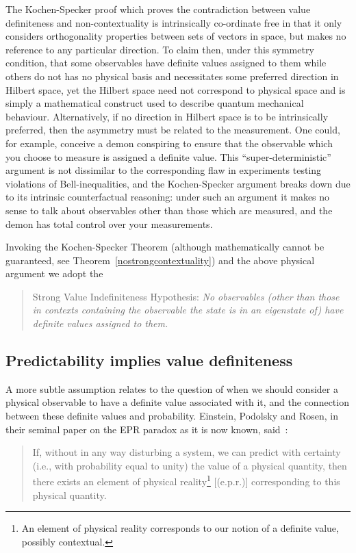 \documentclass[11pt, a4paper]{article}
\theoremstyle{definition}
\begin{document}
The Kochen-Specker proof which proves the contradiction between value definiteness and non-contextuality is intrinsically co-ordinate free in that it only considers orthogonality properties between sets of vectors in space, but makes no reference to any particular direction.
To claim then, under this symmetry condition, that some observables have definite values assigned to them while others do not has no physical basis and necessitates some preferred direction in Hilbert space, yet the Hilbert space need not correspond to physical space and is simply a mathematical construct used to describe quantum mechanical behaviour.
Alternatively, if no direction in Hilbert space is to be intrinsically preferred, then the asymmetry must be related to the measurement.
One could, for example, conceive a demon conspiring to ensure that the observable which you choose to measure is assigned a definite value.
This ``super-deterministic'' argument is not dissimilar to the corresponding flaw in experiments testing violations of Bell-inequalities, and the Kochen-Specker argument breaks down due to its intrinsic counterfactual reasoning:
under such an argument it makes no sense to talk about observables other than those which are measured, and the demon has total control over your measurements.

 Invoking the Kochen-Specker Theorem (although mathematically cannot be guaranteed, see Theorem~\ref{nostrongcontextuality})
and the above physical argument we adopt the
 \begin{quote}
 Strong Value Indefiniteness Hypothesis: {\em No observables (other than those in contexts containing the observable the state is in an eigenstate of) have definite values assigned to them.}
 \end{quote}
\fi


\subsection{Predictability implies value definiteness}
\label{sec:predImpliesVI}

A more subtle assumption relates to the question of when we should consider a physical observable to have a definite value associated with it, and the connection between these definite values and probability.
Einstein, Podolsky and Rosen, in their seminal paper on the EPR paradox as it is now known, said~\cite[pp. 777]{epr}:
\begin{quote}
	If, without in any way disturbing a system, we can predict with certainty (i.e., with probability equal to unity) the value of a physical quantity, then there exists an element of physical reality\footnote{An element of physical reality corresponds to our notion of a definite value, possibly contextual.} [(e.p.r.)] corresponding to this physical quantity.
\end{quote}
\end{document}
